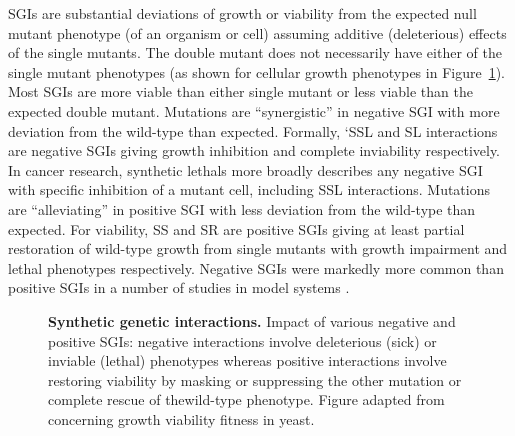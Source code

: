 \glspl{SGI} are substantial deviations of growth or viability from the expected null \gls{mutant} phenotype (of an organism or cell) assuming additive (deleterious) effects of the single \glspl{mutant}. The double \gls{mutant} does not necessarily have either of the single \gls{mutant} phenotypes (as shown for cellular growth phenotypes in Figure~\ref{fig:Costanzo2011}). Most \glspl{SGI} are more viable than either single \gls{mutant} or less viable than the expected double \gls{mutant}. Mutations are ``synergistic'' in negative \gls{SGI} with more deviation from the \gls{wild-type} than expected. Formally, `\gls{SSL} and \gls{SL} interactions are negative \glspl{SGI} giving growth inhibition and complete inviability respectively. In cancer research, \glspl{synthetic lethal} more broadly describes any negative \gls{SGI} with specific inhibition of a \gls{mutant} cell, including \gls{SSL} interactions. Mutations are ``alleviating'' in positive \gls{SGI} with less deviation from the \gls{wild-type} than expected. For viability, \gls{SS} and \gls{SR} are positive \glspl{SGI} giving at least partial restoration of \gls{wild-type} growth from single \glspl{mutant} with growth impairment and lethal phenotypes respectively. Negative \glspl{SGI} were markedly more common than positive \glspl{SGI} in a number of studies in model systems \citep{Tong2004, Boucher2013}. 

\begin{figure}[!ht]
   \caption[Synthetic genetic interactions]{\small \textbf{Synthetic genetic interactions.} Impact of various negative and positive \glspl{SGI}: negative interactions involve deleterious (sick) or inviable (lethal) phenotypes whereas positive interactions involve restoring viability by masking or suppressing the other \gls{mutation} or complete rescue of the\gls{wild-type} phenotype. Figure adapted from \citep{Costanzo2011} concerning growth viability fitness in yeast.}
\label{fig:Costanzo2011}
\end{figure}

